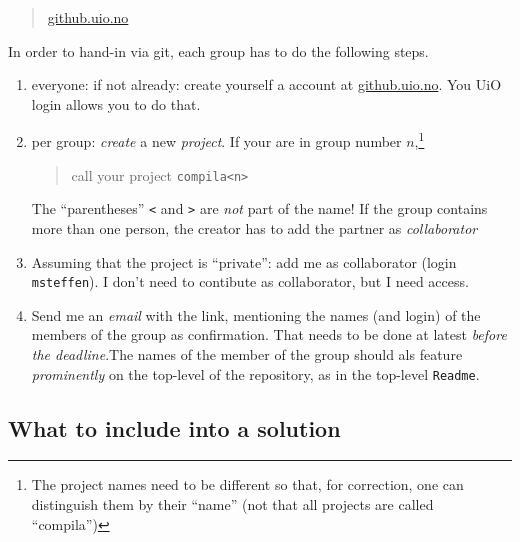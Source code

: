 \documentclass[11pt,freeform]{handout}[2014/08/13]
\begin{document}
\begin{quote}
  \url{github.uio.no}
\end{quote}


In order to hand-in via git, each group has to do the following steps.

\begin{enumerate}
\item everyone: if not already: create yourself a account at
  \url{github.uio.no}. You UiO login allows you to do that. 
\item per group: \emph{create} a new \emph{project}.  If your are in group
  number $n$,\footnote{The project names need to be different so that, for
    correction, one can distinguish them by their ``name'' (not that all
    projects are called ``compila'')}
  \begin{quote}
    call your project \texttt{compila<n>}
  \end{quote}
  The ``parentheses'' \texttt{<} and \texttt{>} are \emph{not} part of the
  name! If the group contains more than one person, the creator has to add
  the partner as \emph{collaborator} 
\item Assuming that the project is ``private'': add me as collaborator
  (login \texttt{msteffen}). I don't need to contibute as collaborator, but
  I need access.
\item Send me an \emph{email} with the link, mentioning the names (and
  login) of the members of the group as confirmation. That needs to be done
  at latest \emph{before the deadline}.The names of the member of the group should als
  feature \emph{prominently} on the top-level of the repository, as in the
  top-level \texttt{Readme}.
\end{enumerate}

\subsection{What to include into a solution}
\label{sec:what-include-into}
\end{document}
